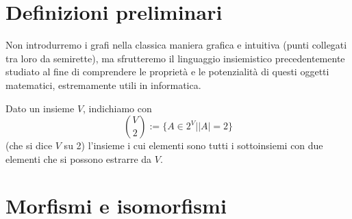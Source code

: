 
\section{Definizioni preliminari}
Non introdurremo i grafi nella classica maniera grafica e intuitiva
(punti collegati tra loro da semirette), ma sfrutteremo il linguaggio
insiemistico precedentemente studiato al fine di comprendere le proprietà
e le potenzialità di questi oggetti matematici, estremamente utili in
informatica.

\begin{tcolorbox}[colback=yellow!30, colframe=yellow!30!black, title=Insieme dei 2-sottoinsiemi]
Dato un insieme $V$, indichiamo con
\[ \binom{V}{2}:=\{ A \in 2^V| \left|A\right|=2 \} \]
(che si dice $V$ su 2) l'insieme i cui elementi sono tutti
i sottoinsiemi con due elementi che si possono estrarre da $V$.
\end{tcolorbox}



\section{Morfismi e isomorfismi}